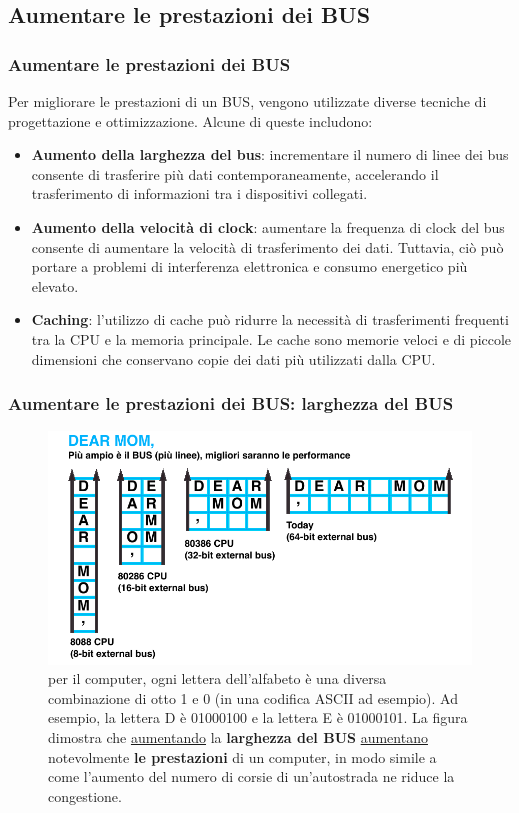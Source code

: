 \subsection[Aumentare le prestazioni dei BUS]{Aumentare le prestazioni dei BUS}
\begin{frame}
	\frametitle{Aumentare le prestazioni dei BUS}
	  
	\begin{block}{}
		Per migliorare le prestazioni di un BUS, vengono utilizzate diverse tecniche di progettazione e ottimizzazione. Alcune di queste includono:
		\begin{itemize}
			\item \textbf{Aumento della larghezza del bus}: incrementare il numero di linee dei bus consente di trasferire più dati contemporaneamente, accelerando il trasferimento di informazioni tra i dispositivi collegati.
			\item \textbf{Aumento della velocità di clock}: aumentare la frequenza di clock del bus consente di aumentare la velocità di trasferimento dei dati. Tuttavia, ciò può portare a problemi di interferenza elettronica e consumo energetico più elevato.
			\item \textbf{Caching}: l'utilizzo di cache può ridurre la necessità di trasferimenti frequenti tra la CPU e la memoria principale. Le cache sono memorie veloci e di piccole dimensioni che conservano copie dei dati più utilizzati dalla CPU.
		\end{itemize}
		
	\end{block}

\end{frame}


\begin{frame}
	\frametitle{Aumentare le prestazioni dei BUS: larghezza del BUS}
	  
	\begin{figure}[!htbp]
		\centering
		\includegraphics[width=0.715\linewidth]{images/6_bus/bus_size.pdf}
		\caption{per il computer, ogni lettera dell'alfabeto è una diversa combinazione di otto 1 e 0 (in una codifica ASCII ad esempio). Ad esempio, la lettera D è 01000100 e la lettera E è 01000101. La figura dimostra che \underline{aumentando} la \textbf{larghezza del BUS} \underline{aumentano} notevolmente \textbf{le prestazioni} di un computer, in modo simile a come l'aumento del numero di corsie di un'autostrada ne riduce la congestione.}
	\end{figure}
\end{frame}




